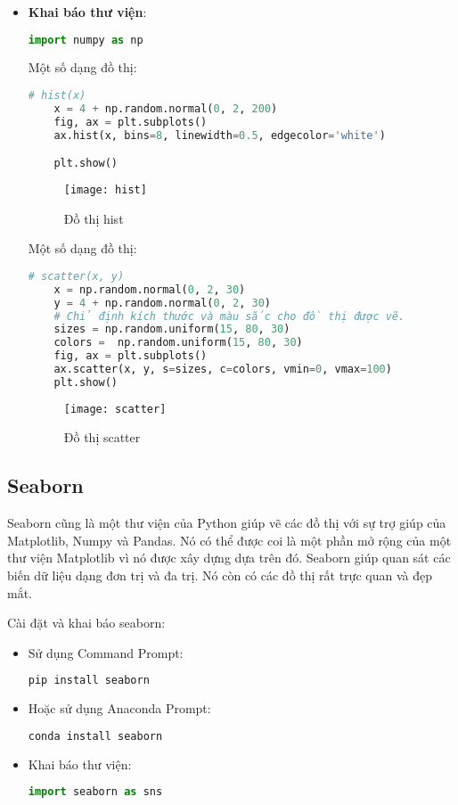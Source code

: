 \documentclass[../main-report.tex]{subfiles}
\begin{document}
\begin{itemize}
\item \textbf{Khai báo thư viện}: 
\begin{lstlisting}[language=Python] 
import numpy as np
\end{lstlisting}

\begin{example}
Một số dạng đồ thị: 
\begin{lstlisting}[language=Python]
    # hist(x)
    x = 4 + np.random.normal(0, 2, 200)
    fig, ax = plt.subplots()
    ax.hist(x, bins=8, linewidth=0.5, edgecolor='white')

    plt.show()
\end{lstlisting}
\begin{figure}[ht!]
\centering\texttt{[image: hist]}
\caption{Đồ thị hist}
\label{fig:hist}
\end{figure}
\end{example}

\begin{example}
Một số dạng đồ thị:
\begin{lstlisting}[language=Python]
    # scatter(x, y)
    x = np.random.normal(0, 2, 30)
    y = 4 + np.random.normal(0, 2, 30)
    # Chỉ định kích thước và màu sắc cho đồ thị được vẽ.
    sizes = np.random.uniform(15, 80, 30)
    colors =  np.random.uniform(15, 80, 30)
    fig, ax = plt.subplots()
    ax.scatter(x, y, s=sizes, c=colors, vmin=0, vmax=100)
    plt.show()
\end{lstlisting}
\begin{figure}[ht!]
\centering\texttt{[image: scatter]}
\caption{Đồ thị scatter}
\label{fig:scatter}
\end{figure}
\end{example}

\end{itemize}
\subsection{Seaborn}
Seaborn cũng là một thư viện của Python giúp vẽ các đồ thị với sự trợ giúp của Matplotlib, Numpy và Pandas. Nó có thể
được coi là một phần mở rộng của một thư viện Matplotlib vì nó được xây dựng dựa trên đó. Seaborn giúp quan sát các biến dữ liệu dạng đơn trị và đa trị.
Nó còn có các đồ thị rất trực quan và đẹp mắt.

Cài đặt và khai báo seaborn:
\begin{itemize}
    \item Sử dụng Command Prompt: 
    \begin{lstlisting}[language=Python]
        pip install seaborn
    \end{lstlisting}
    \item Hoặc sử dụng Anaconda Prompt:
    \begin{lstlisting}[language=Python]
        conda install seaborn
    \end{lstlisting}
    \item Khai báo thư viện:
    \begin{lstlisting}[language=Python]
        import seaborn as sns
    \end{lstlisting}
\end{itemize}
\end{document}
